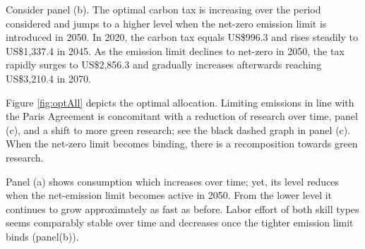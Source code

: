 

Consider panel (b). The optimal carbon tax is increasing over the period considered and jumps to a higher level when the net-zero emission limit is introduced in 2050.
In 2020, the carbon tax equals US\$996.3 and rises steadily to US\$1,337.4 in 2045.  As the emission limit declines to net-zero in 2050, the tax rapidly surges to US\$2,856.3 and gradually increases afterwards reaching US\$3,210.4 in 2070. 

Figure \ref{fig:optAll} depicts the optimal allocation. Limiting emissions in line with the Paris Agreement is concomitant with a reduction of research over time, panel (c), and a shift to more green research; see the black dashed graph in panel (c).  When the net-zero limit becomes binding, there is a recomposition towards green research. 
 
Panel (a) shows consumption which increases over time; yet, its level reduces when the net-emission limit becomes active in  2050. From the lower level it continues to grow approximately as fast as before. Labor effort of both skill types seems comparably stable over time  and decreases once the tighter emission limit binds (panel(b)).


